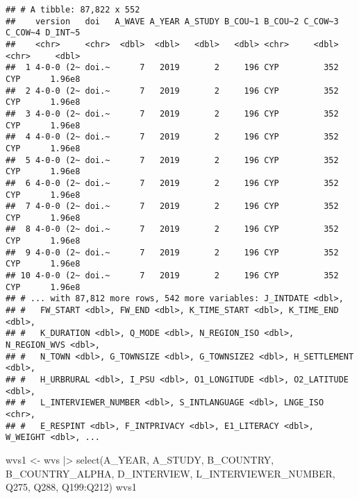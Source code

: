 \documentclass[
]{article}
\newenvironment{Shaded}{\begin{snugshade}}{\end{snugshade}}
\newcommand{\FunctionTok}[1]{\textcolor[rgb]{0.00,0.00,0.00}{#1}}
\newcommand{\NormalTok}[1]{#1}
\newcommand{\OtherTok}[1]{\textcolor[rgb]{0.56,0.35,0.01}{#1}}
\newcommand{\SpecialCharTok}[1]{\textcolor[rgb]{0.00,0.00,0.00}{#1}}
\begin{document}
\begin{verbatim}
## # A tibble: 87,822 x 552
##    version   doi   A_WAVE A_YEAR A_STUDY B_COU~1 B_COU~2 C_COW~3 C_COW~4 D_INT~5
##    <chr>     <chr>  <dbl>  <dbl>   <dbl>   <dbl> <chr>     <dbl> <chr>     <dbl>
##  1 4-0-0 (2~ doi.~      7   2019       2     196 CYP         352 CYP      1.96e8
##  2 4-0-0 (2~ doi.~      7   2019       2     196 CYP         352 CYP      1.96e8
##  3 4-0-0 (2~ doi.~      7   2019       2     196 CYP         352 CYP      1.96e8
##  4 4-0-0 (2~ doi.~      7   2019       2     196 CYP         352 CYP      1.96e8
##  5 4-0-0 (2~ doi.~      7   2019       2     196 CYP         352 CYP      1.96e8
##  6 4-0-0 (2~ doi.~      7   2019       2     196 CYP         352 CYP      1.96e8
##  7 4-0-0 (2~ doi.~      7   2019       2     196 CYP         352 CYP      1.96e8
##  8 4-0-0 (2~ doi.~      7   2019       2     196 CYP         352 CYP      1.96e8
##  9 4-0-0 (2~ doi.~      7   2019       2     196 CYP         352 CYP      1.96e8
## 10 4-0-0 (2~ doi.~      7   2019       2     196 CYP         352 CYP      1.96e8
## # ... with 87,812 more rows, 542 more variables: J_INTDATE <dbl>,
## #   FW_START <dbl>, FW_END <dbl>, K_TIME_START <dbl>, K_TIME_END <dbl>,
## #   K_DURATION <dbl>, Q_MODE <dbl>, N_REGION_ISO <dbl>, N_REGION_WVS <dbl>,
## #   N_TOWN <dbl>, G_TOWNSIZE <dbl>, G_TOWNSIZE2 <dbl>, H_SETTLEMENT <dbl>,
## #   H_URBRURAL <dbl>, I_PSU <dbl>, O1_LONGITUDE <dbl>, O2_LATITUDE <dbl>,
## #   L_INTERVIEWER_NUMBER <dbl>, S_INTLANGUAGE <dbl>, LNGE_ISO <chr>,
## #   E_RESPINT <dbl>, F_INTPRIVACY <dbl>, E1_LITERACY <dbl>, W_WEIGHT <dbl>, ...
\end{verbatim}

\begin{Shaded}
\begin{Highlighting}[]
\NormalTok{wvs1 }\OtherTok{\textless{}{-}}\NormalTok{ wvs }\SpecialCharTok{|\textgreater{}}
  \FunctionTok{select}\NormalTok{(A\_YEAR, A\_STUDY, B\_COUNTRY, B\_COUNTRY\_ALPHA, D\_INTERVIEW, L\_INTERVIEWER\_NUMBER, Q275, Q288, Q199}\SpecialCharTok{:}\NormalTok{Q212)}
\NormalTok{wvs1}
\end{Highlighting}
\end{Shaded}
\end{document}
